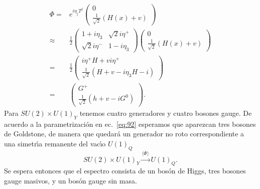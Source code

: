 \begin{align}
\label{eq:92}
  \Phi=&e^{i\eta_jT^j}
  \begin{pmatrix}
    0\\
    \frac{1}{\sqrt{2}}(H(x)+v)
  \end{pmatrix}\\
  \approx&
  \frac{1}{2}\begin{pmatrix}
    1+i\eta_3&\sqrt{2}i\eta^+\\
    \sqrt{2}i\eta^-&1-i\eta_3
  \end{pmatrix}  \begin{pmatrix}
    0\\
    \frac{1}{\sqrt{2}}(H(x)+v)
  \end{pmatrix}\nonumber\\
  =&\frac{1}{2}\begin{pmatrix}
    i\eta^+H+vi\eta^+\\
    \frac{1}{\sqrt{2}}(H+v-i\eta_3H-i)
  \end{pmatrix}\nonumber\\
  =&\begin{pmatrix}
    G^+\\
    \frac{1}{\sqrt{2}}(h+v-iG^0)
  \end{pmatrix}.\nonumber
\end{align}
Para $SU(2)\times U(1)_Y$ tenemos cuatro generadores y cuatro bosones gauge. De acuerdo a la parametrizaci\'on en ec.~\eqref{eq:92} esperamos que aparezcan tres bosones de Goldstone, de manera que quedar\'a un generador no roto correspondiente a una simetr\'\i a remanente del vac\'\i o $U(1)_Q$
\begin{equation}
  SU(2)\times U(1)_Y\overset{\langle\Phi\rangle}{\longrightarrow}U(1)_Q.
\end{equation}
Se espera entonces que el espectro consista de un bos\'on de Higgs, tres bosones gauge masivos, y un bos\'on gauge sin masa.

